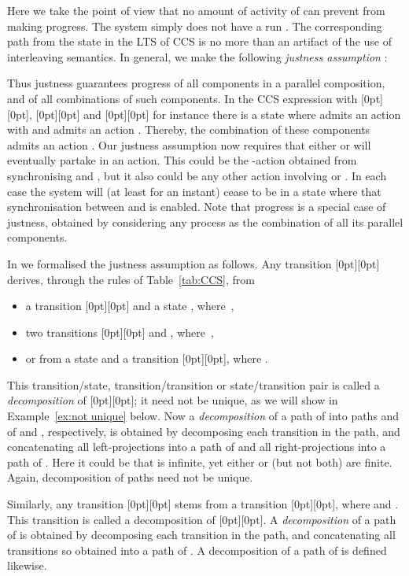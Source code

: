 \documentclass[smallcondensed]{svjour3}
\newcommand{\plat}[1]{\raisebox{0pt}[0pt][0pt]{#1}}  \def\precond#1{{\vphantom{#1}}^\bullet #1}
\newcommand{\Ex}[1]{Example~\ref{ex:#1}}
\newcommand{\Tab}[1]{Table~\ref{tab:#1}}
\newcounter {part}
\begin{document}
Here we take the point of view that no amount of activity of  can prevent  from making
progress. The system  simply does not have a run .
The corresponding path from the state  in the LTS of CCS is no
more than an artifact of the use of interleaving semantics. In general, we make the following
\emph{justness assumption} \cite{GH14}: 

Thus justness guarantees progress of all components in a parallel composition, and of all
combinations of such components.\vspace{2pt} In the CCS expression  
with  
\plat{}, 
\plat{} and 
\plat{}
 for
instance
there is a state where  admits an action  with  and  admits an action
. Thereby, the combination of these components admits an action . Our justness
assumption now requires that either  or  will eventually
partake in an action.
This could be the -action obtained from synchronising  and , but it also could be
any other action involving  or . In each case the system will (at least for an instant) cease to be in a state where that
synchronisation between  and  is enabled.
Note that progress is a special case of justness, obtained by considering any process as the
combination of all its parallel components.

In \cite{GH14} we formalised the justness assumption as follows.\newline
Any transition \plat{} derives, through the
rules of \Tab{CCS}, from
\vspace{-1ex}
\begin{itemize}
\item a transition \plat{} and a state , where \,,
\item two transitions \plat{ and }, where \,,
\item or from a state  and a transition \plat{}, where .
\vspace{-1ex}
\end{itemize}
This transition/state, transition/transition or state/transition pair is called a \emph{decomposition}
of \plat{}; it need not be unique, as we will show in \Ex{not unique} below.
Now a \emph{decomposition} of a path  of  into paths  and  of
 and , respectively, is obtained by \hypertarget{hr:decomp}{decomposing}\label{pg:decomp} each transition in the path, and
concatenating all left-projections into a path of  and all right-projections into a
path of .
Here it could be that  is infinite, yet either  or  (but not both) are finite.
Again, decomposition of paths need not be unique.

Similarly, any transition \plat{} stems from a transition \plat{},
where  and .
This transition is called a decomposition of \plat{}. A \emph{decomposition}
of a path  of  is obtained by decomposing each transition in the path, and
concatenating all transitions so obtained into a path of .
A decomposition of a path of  is defined likewise.
\end{document}
